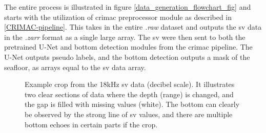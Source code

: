         The entire process is illustrated in figure \ref{data_generation_flowchart_fig} and starts with the utilization of \gls{crimac} preprocessor module as described in \ref{CRIMAC-pipeline}. This takes in the entire \textit{.raw} dataset and outputs the \gls{sv} data in the \textit{.zarr} format as a single large array. The \gls{sv} were then sent to both the pretrained U-Net and bottom detection modules from the \gls{crimac} pipeline. The U-Net outputs pseudo labels, and the bottom detection outputs a mask of the seafloor, as arrays equal to the \gls{sv} data array.
        
        \begin{figure}[H]
            \centering
            
            \caption[Missing values and bottom]{Example crop from the 18kHz \gls{sv} data (decibel scale). It illustrates two clear sections of data where the depth (range) is changed, and the gap is filled with missing values (white). The bottom can clearly be observed by the strong line of \gls{sv} values, and there are multiple bottom echoes in certain parts if the crop.}
          	\medskip 
            \label{data_bottom_nans_fig}
        \end{figure}
        

